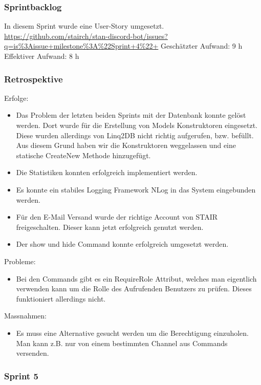 \documentclass[a4paper, table]{article}
\begin{document}
\subsubsection*{Sprintbacklog}
In diesem Sprint wurde eine User-Story umgesetzt.\\
\url{https://github.com/stairch/stan-discord-bot/issues?q=is%3Aissue+milestone%3A%22Sprint+4%22+}
\newline
Geschätzter Aufwand: 9 h
\newline
Effektiver Aufwand: 8 h

\subsubsection*{Retrospektive}
Erfolge:
\begin{itemize}
    \item Das Problem der letzten beiden Sprints mit der Datenbank konnte gelöst werden.
    Dort wurde für die Erstellung von Models Konstruktoren eingesetzt.
    Diese wurden allerdings von Linq2DB nicht richtig aufgerufen, bzw. befüllt.
    Aus diesem Grund haben wir die Konstruktoren weggelassen und eine statische CreateNew Methode hinzugefügt.
    \item Die Statistiken konnten erfolgreich implementiert werden.
    \item Es konnte ein stabiles Logging Framework NLog in das System eingebunden werden.
    \item Für den E-Mail Versand wurde der richtige Account von STAIR freigeschalten.
    Dieser kann jetzt erfolgreich genutzt werden.
    \item Der show und hide Command konnte erfolgreich umgesetzt werden.
\end{itemize}
Probleme:
\begin{itemize}
    \item Bei den Commands gibt es ein RequireRole Attribut, welches man eigentlich verwenden kann um die Rolle des Aufrufenden Benutzers zu prüfen.
    Dieses funktioniert allerdings nicht.
\end{itemize}
Massnahmen:
\begin{itemize}
    \item Es muss eine Alternative gesucht werden um die Berechtigung einzuholen.
    Man kann z.B. nur von einem bestimmten Channel aus Commands versenden.
\end{itemize}

\newpage
\subsubsection{Sprint 5}
\end{document}

